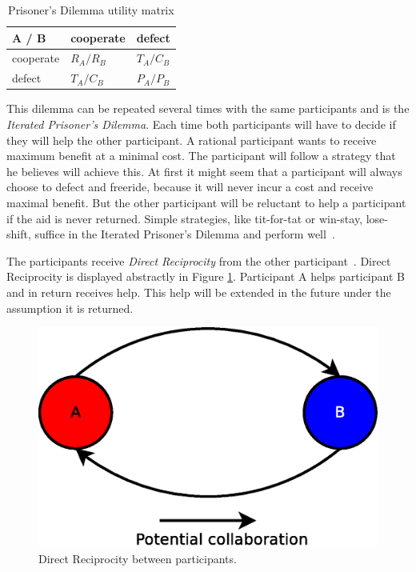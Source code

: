 \begin{table}
\center
	\begin{tabular}{l|ll}
	A / B       & cooperate  & defect     \\ \hline
	cooperate & $R_A /R_B$ & $T_A /C_B$ \\
	defect    & $T_A /C_B$ & $P_A /P_B$
	\end{tabular}
\caption{Prisoner's Dilemma utility matrix}
\label{tab:pd-um}
\end{table}

This dilemma can be repeated several times with the same participants and is the \emph{Iterated Prisoner's Dilemma}.
Each time both participants will have to decide if they will help the other participant.
A rational participant wants to receive maximum benefit at a minimal cost.
The participant will follow a strategy that he believes will achieve this.
At first it might seem that a participant will always choose to defect and freeride,
because it will never incur a cost and receive maximal benefit.
But the other participant will be reluctant to help a participant if the aid is never returned.
Simple strategies, like tit-for-tat or win-stay, lose-shift, suffice in the Iterated Prisoner's Dilemma
and perform well~\cite{Nowak-Cooperation}.

The participants receive \emph{Direct Reciprocity} from the other participant~\cite{Nowak-Cooperation}.
Direct Reciprocity is displayed abstractly in Figure \ref{fig:direct-reciprocity}.
Participant A helps participant B and in return receives help.
This help will be extended in the future under the assumption it is returned.

\begin{figure}
	\centerline{\includegraphics[scale=0.3]{problemDescription/figs/direct-reciprocity.eps}}
	\caption{Direct Reciprocity between participants.}
	\label{fig:direct-reciprocity}
\end{figure}

